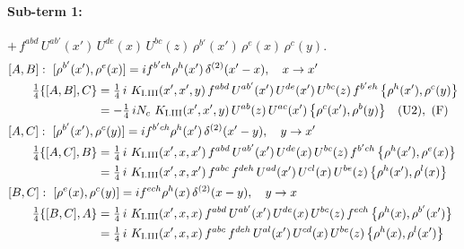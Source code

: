 \documentclass[10pt]{article}
\numberwithin{equation}{section}
\begin{document}
\paragraph{Sub-term 1:} $+\,f^{abd}\,U^{ab'}(x')\,U^{de}(x)\,U^{bc}(z)\,\rho^{b'}(x')\,\rho^{e}(x)\,\rho^{c}(y)$.
\begin{align}
&[A,B]:\ [\rho^{b'}(x'),\rho^{e}(x)]=i f^{b'eh}\rho^{h}(x')\,\delta^{(2)}(x'-x),\quad x\to x'\notag\\
&\qquad \tfrac14\{[A,B],C\}=\tfrac14\,i\,\,K_{\rm I.III}(x',x',y)\,f^{abd}\,U^{ab'}(x')\,U^{de}(x')\,U^{bc}(z)\,f^{b'eh}\,\big\{\rho^{h}(x'),\rho^{c}(y)\big\}\notag\\
&\qquad\phantom{\tfrac14\{[A,B],C\}}=-\tfrac14\,i N_{c}\,\,K_{\rm I.III}(x',x',y)\,U^{ab}(z)\,U^{ac}(x')\,\big\{\rho^{c}(x'),\rho^{b}(y)\big\}\quad\text{(U2)},\ \text{(F)}
\label{eq:GI.III-1-AB}\\
&[A,C]:\ [\rho^{b'}(x'),\rho^{c}(y)]=i f^{b'ch}\rho^{h}(x')\,\delta^{(2)}(x'-y),\quad y\to x'\notag\\
&\qquad \tfrac14\{[A,C],B\}=\tfrac14\,i\,\,K_{\rm I.III}(x',x,x')\,f^{abd}\,U^{ab'}(x')\,U^{de}(x)\,U^{bc}(z)\,f^{b'ch}\,\big\{\rho^{h}(x'),\rho^{e}(x)\big\}\notag\\
&\qquad\phantom{\tfrac14\{[A,C],B\}}=\tfrac14\,i\,\,K_{\rm I.III}(x',x,x')\,f^{abc}\,f^{deh}\,U^{ad}(x')\,U^{cl}(x)\,U^{be}(z)\,\big\{\rho^{h}(x'),\rho^{l}(x)\big\}
\label{eq:GI.III-1-AC}\\
&[B,C]:\ [\rho^{e}(x),\rho^{c}(y)]=i f^{ech}\rho^{h}(x)\,\delta^{(2)}(x-y),\quad y\to x\notag\\
&\qquad \tfrac14\{[B,C],A\}=\tfrac14\,i\,\,K_{\rm I.III}(x',x,x)\,f^{abd}\,U^{ab'}(x')\,U^{de}(x)\,U^{bc}(z)\,f^{ech}\,\big\{\rho^{h}(x),\rho^{b'}(x')\big\}\notag\\
&\qquad\phantom{\tfrac14\{[B,C],A\}}=\tfrac14\,i\,\,K_{\rm I.III}(x',x,x)\,f^{abc}\,f^{deh}\,U^{al}(x')\,U^{cd}(x)\,U^{be}(z)\,\big\{\rho^{h}(x),\rho^{l}(x')\big\}
\label{eq:GI.III-1-BC}
\end{align}
\end{document}
